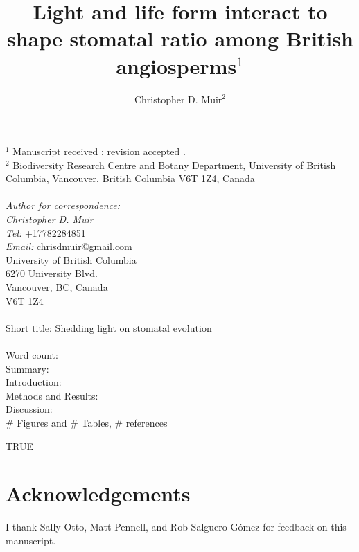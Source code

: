 \documentclass[12pt, oneside]{article}
\begin{document}


\title{Light and life form interact to shape stomatal ratio among British angiosperms$^1$}
\author{Christopher D. Muir$^2$}
\date{} %

\maketitle

$^1$ Manuscript received \underline{     }; revision accepted \underline{     }. \\

$^2$ Biodiversity Research Centre and Botany Department, University of British Columbia, Vancouver, British Columbia V6T 1Z4, Canada \\
\\
\textit{Author for correspondence:} \\
\textit{Christopher D. Muir} \\
\textit{Tel:} +17782284851 \\
\textit{Email:} chrisdmuir@gmail.com \\
University of British Columbia \\
6270 University Blvd. \\
Vancouver, BC, Canada \\
V6T 1Z4 \\
\\
Short title: Shedding light on stomatal evolution\\
\\
Word count: \\
Summary:  \\
Introduction:  \\
Methods and Results:  \\
Discussion:  \\
\# Figures and \# Tables, \# references

\begin{Schunk}
\begin{Soutput}
[1] TRUE
\end{Soutput}
\end{Schunk}


\section*{Acknowledgements}
I thank Sally Otto, Matt Pennell, and Rob Salguero-G\'{o}mez for feedback on this manuscript.
\end{document}
